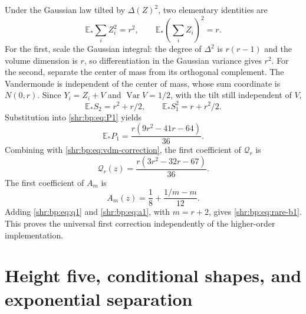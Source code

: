 \documentclass[11pt,letterpaper]{article}
\numberwithin{equation}{section}
\theoremstyle{definition}
\newcommand{\E}{\mathbb E}
\newcommand{\1}{\mathbf 1}
\DeclareMathOperator{\Var}{Var}
\begin{document}
Under the Gaussian law tilted by $\Delta(Z)^2$, two elementary identities
are
\begin{equation}
 \E_*\sum_i Z_i^2=r^2,\qquad
 \E_*\left(\sum_iZ_i\right)^2=r.
 \label{shr:bp:eq:gue-moments}
\end{equation}
For the first, scale the Gaussian integral: the degree of $\Delta^2$ is
$r(r-1)$ and the volume dimension is $r$, so differentiation in the
Gaussian variance gives $r^2$. For the second, separate the center of
mass from its orthogonal complement. The Vandermonde is independent of
the center of mass, whose sum coordinate is $N(0,r)$.
Since $Y_i=Z_i+V$ and $\Var V=1/2$, with the tilt still independent of $V$,
\begin{equation}
 \E_*S_2=r^2+r/2,\qquad
 \E_*S_1^2=r+r^2/2.
 \label{shr:bp:eq:shifted-moments}
\end{equation}
Substitution into \eqref{shr:bp:eq:P1} yields
\begin{equation}
 \E_*P_1=\frac{r(9r^2-41r-64)}{36}.
\end{equation}
Combining with \eqref{shr:bp:eq:vdm-correction}, the first coefficient of $\mathcal Q_r$ is
\begin{equation}
 [z]\mathcal Q_r(z)=\frac{r(3r^2-32r-67)}{36}.
 \label{shr:bp:eq:q1}
\end{equation}
The first coefficient of $A_m$ is
\begin{equation}
 [z]A_m(z)=\frac18+\frac{1/m-m}{12}.
 \label{shr:bp:eq:a1}
\end{equation}
Adding \eqref{shr:bp:eq:q1} and \eqref{shr:bp:eq:a1}, with $m=r+2$, gives
\eqref{shr:bp:eq:rare-b1}. This proves the universal first correction independently
of the higher-order implementation.

\section{Height five, conditional shapes, and exponential separation}
\label{shr:bp:sec:five}
\end{document}
